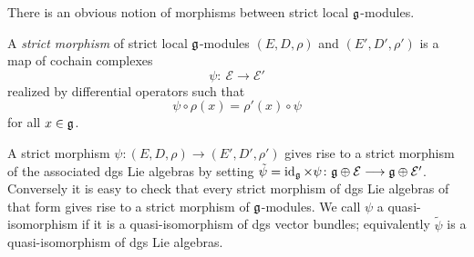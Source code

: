 \documentclass[11pt]{article}
\numberwithin{equation}{section}
\numberwithin{equation}{section}
\def\cE{\mathcal E}\def\cF{\mathcal F}\def\cG{\mathcal G}\def\cH{\mathcal H}
\DeclareMathOperator{\id}{id}
\begin{document}
There is an obvious notion of morphisms between strict local $\mathfrak g$-modules.
\begin{dfn}
	A \emph{strict morphism} of strict local $\mathfrak g$-modules	$(E,D,\rho)$ and $(E',D',\rho')$ is a map of cochain complexes
	\begin{equation*}
	\psi \colon \ \cE \longrightarrow \cE'
	\end{equation*}
	realized by differential operators such that
	\begin{equation*}
	\psi \circ \rho(x) = \rho'(x) \circ \psi
	\end{equation*}
	for all $x \in \mathfrak g$.
\end{dfn}
A strict morphism $\psi \colon (E,D,\rho) \longrightarrow (E',D',\rho')$ gives rise to a strict morphism of the associated dgs Lie algebras by setting $\tilde{\psi} = \id_{\fg} \times \psi \colon \fg \oplus \cE \longrightarrow \fg \oplus \cE'$. Conversely it is easy to check that every strict morphism of dgs Lie algebras of that form gives rise to a strict morphism of $\mathfrak g$-modules. We call $\psi$ a quasi-isomorphism if it is a quasi-isomorphism of dgs vector bundles; equivalently $\tilde{\psi}$ is a quasi-isomorphism of dgs Lie algebras.
\end{document}
